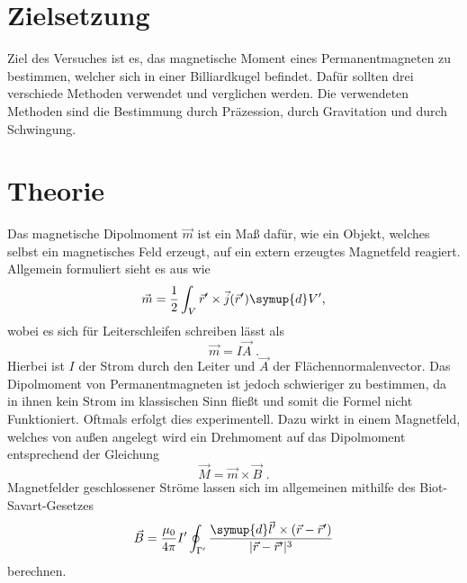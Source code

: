 \section{Zielsetzung}
Ziel des Versuches ist es, das magnetische Moment eines Permanentmagneten zu bestimmen, welcher sich in einer Billiardkugel befindet.
Dafür sollten drei verschiede Methoden verwendet und verglichen werden.
Die verwendeten Methoden sind die Bestimmung durch Präzession, durch Gravitation und durch Schwingung.

\section{Theorie}
\label{sec:Theorie}

Das magnetische Dipolmoment $\vec{m}$ ist ein Maß dafür, wie ein Objekt, welches selbst ein magnetisches Feld erzeugt, auf ein extern erzeugtes
Magnetfeld reagiert. Allgemein formuliert sieht es aus wie
\begin{equation}
    \vec{m}=\frac{1}{2}\int_{V}\vec{r}'\times\vec{j}(\vec{r}')\symup{d}V' \text{,}
\end{equation}
wobei es sich für Leiterschleifen schreiben lässt als
\begin{equation}
    \vec{m}=I\vec{A}\text{ .}
\end{equation}
Hierbei ist $I$ der Strom durch den Leiter und $\vec{A}$ der Flächennormalenvector. 
Das Dipolmoment von Permanentmagneten ist jedoch schwieriger zu bestimmen, da in ihnen kein Strom im klassischen Sinn fließt und
somit die Formel nicht Funktioniert. Oftmals erfolgt dies experimentell.
Dazu wirkt in einem Magnetfeld,
welches von außen angelegt wird ein Drehmoment auf das Dipolmoment entsprechend der Gleichung
\begin{equation}
    \vec{M}=\vec{m}\times\vec{B}\text{ .}
    \label{eqn:MagDreh}
\end{equation}
Magnetfelder geschlossener Ströme lassen sich im allgemeinen mithilfe des Biot-Savart-Gesetzes
\begin{equation}
    \vec{B}=\frac{\mu_0}{4\pi}I'\oint_{\Gamma'}\frac{\symup{d}\vec{l}'\times(\vec{r}-\vec{r}')}{|\vec{r}-\vec{r}'|^3}
    \label{eqn:Biot}
\end{equation} 
berechnen. \\

